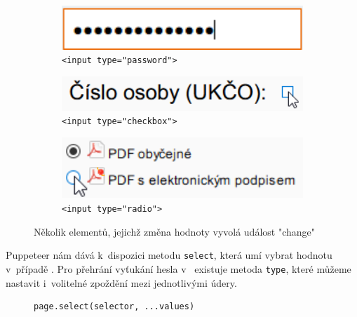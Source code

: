 \documentclass[12pt, a4paper, twoside]{article}
\begin{document}
\begin{figure}[H]
\begin{minipage}{0.45\textwidth}
		\begin{subfigure}[t]{1.0\textwidth}
			\includegraphics[width=1\textwidth]{passwordChange.png}
			\caption{\foreignlanguage{english}{\texttt{<input type="password">}}}
			\vspace{0.3cm}
			\label{subfig:passwordChange}
		\end{subfigure}	
	\vspace{0.3cm}
	\begin{subfigure}{1.0\textwidth}
		\includegraphics[width=1\textwidth]{checkboxChange.png}
		\caption{\foreignlanguage{english}{\texttt{<input type="checkbox">}}}
		\label{subfig:checkboxChange}
	\end{subfigure}	
	\begin{subfigure}{1.0\textwidth}
		\includegraphics[width=1\textwidth]{radioChange.png}
		\caption{\foreignlanguage{english}{\texttt{<input type="radio">}}}
		\label{subfig:radioChange}
	\end{subfigure}
	\end{minipage}
	\caption{Několik elementů, jejichž změna hodnoty vyvolá událost "change"}
	\end{figure}
	\newpage
	Puppeteer nám dává k~dispozici metodu \texttt{select}, která umí vybrat hodnotu v~případě . Pro přehrání vyťukání hesla v~ existuje metoda \texttt{type}, které můžeme nastavit i~volitelné zpoždění mezi jednotlivými údery.
	\begin{codefigure}[H]
	\begin{subfigure}[t]{\textwidth}
	\begin{lstlisting}[style=MyJavaScript]
page.select(selector, ...values)
	\end{lstlisting}
	\caption{}
	\end{subfigure}	
	\end{codefigure}
\end{document}
